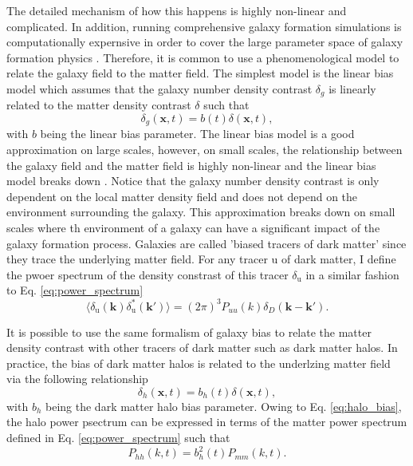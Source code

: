 The detailed mechanism of how this happens is highly non-linear and complicated. In addition, running comprehensive galaxy formation simulations is computationally expernsive in order to cover the large parameter space of galaxy formation physics \citep{somerville2015physical}. Therefore, it is common to use a phenomenological model to relate the galaxy field to the matter field. The simplest model is the linear bias model which assumes that the galaxy number density contrast $\delta_g$ is linearly related to the matter density contrast $\delta$ such that
\begin{equation}
    \delta_g (\mathbf{x}, t) = b(t) \delta(\mathbf{x}, t),
\end{equation}
with $b$ being the linear bias parameter. The linear bias model is a good approximation on large scales, however, on small scales, the relationship between the galaxy field and the matter field is highly non-linear and the linear bias model breaks down \citep{desjacques2018large}. Notice that the galaxy number density contrast is only dependent on the local matter density field and does not depend on the environment surrounding the galaxy. This approximation breaks down on small scales where th environment of a galaxy can have a significant impact of the galaxy formation process. Galaxies are called 'biased tracers of dark matter' since they trace the underlying matter field. For any tracer $\mathrm{u}$ of dark matter, I define the pwoer spectrum of the density constrast of this tracer $\delta_\mathrm{u}$ in a similar fashion to Eq. \ref{eq:power_spectrum}
\begin{equation} \label{eq:power_spectrum_tracers}
    \langle \delta_\mathrm{u}(\mathbf{k}) \delta_\mathrm{u}^*(\mathbf{k}') \rangle = (2\pi)^3 P_{uu}(k) \delta_D(\mathbf{k} - \mathbf{k}').
\end{equation}

It is possible to use the same formalism of galaxy bias to relate the matter density contrast with other tracers of dark matter such as dark matter halos. In practice, the bias of dark matter halos is related to the underlzing matter field via the following relationship
\begin{equation}\label{eq:halo_bias}
    \delta_h (\mathbf{x}, t) = b_h(t) \delta(\mathbf{x}, t),
\end{equation}
with $b_h$ being the dark matter halo bias parameter. Owing to Eq. \ref{eq:halo_bias}, the halo power psectrum can be expressed in terms of the matter power spectrum defined in Eq. \ref{eq:power_spectrum} such that 
\begin{equation}
    P_{hh} (k, t) = b_{h}^2 (t) P_{mm} (k, t).
\end{equation}


